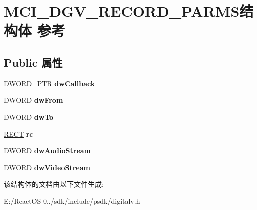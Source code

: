 \hypertarget{struct_m_c_i___d_g_v___r_e_c_o_r_d___p_a_r_m_s}{}\section{M\+C\+I\+\_\+\+D\+G\+V\+\_\+\+R\+E\+C\+O\+R\+D\+\_\+\+P\+A\+R\+M\+S结构体 参考}
\label{struct_m_c_i___d_g_v___r_e_c_o_r_d___p_a_r_m_s}
\subsection*{Public 属性}
\begin{DoxyCompactItemize}
\item 
\mbox{\label{struct_m_c_i___d_g_v___r_e_c_o_r_d___p_a_r_m_s_acfcb54665c051e44754ef7fd17b0f29a}} 
D\+W\+O\+R\+D\+\_\+\+P\+TR {\bfseries dw\+Callback}
\item 
\mbox{\label{struct_m_c_i___d_g_v___r_e_c_o_r_d___p_a_r_m_s_acc8fbaebb99593b7946d05ec93b5f1e1}} 
D\+W\+O\+RD {\bfseries dw\+From}
\item 
\mbox{\label{struct_m_c_i___d_g_v___r_e_c_o_r_d___p_a_r_m_s_a74b64331166d52f69f292d408954c794}} 
D\+W\+O\+RD {\bfseries dw\+To}
\item 
\mbox{\label{struct_m_c_i___d_g_v___r_e_c_o_r_d___p_a_r_m_s_a0b33000958b66650568b9d10298a28c5}} 
\hyperlink{structtag_r_e_c_t}{R\+E\+CT} {\bfseries rc}
\item 
\mbox{\label{struct_m_c_i___d_g_v___r_e_c_o_r_d___p_a_r_m_s_afebade0896893d9221bd9c294b08fba1}} 
D\+W\+O\+RD {\bfseries dw\+Audio\+Stream}
\item 
\mbox{\label{struct_m_c_i___d_g_v___r_e_c_o_r_d___p_a_r_m_s_aa8588899d2176ac84caa0e2b2815240e}} 
D\+W\+O\+RD {\bfseries dw\+Video\+Stream}
\end{DoxyCompactItemize}


该结构体的文档由以下文件生成\+:\begin{DoxyCompactItemize}
\item 
E\+:/\+React\+O\+S-\/0../sdk/include/psdk/digitalv.\+h\end{DoxyCompactItemize}
